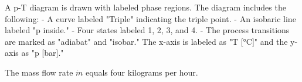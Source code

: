 A p-T diagram is drawn with labeled phase regions. The diagram includes the following:  
- A curve labeled "Triple" indicating the triple point.  
- An isobaric line labeled "p inside."  
- Four states labeled 1, 2, 3, and 4.  
- The process transitions are marked as "adiabat" and "isobar."  
The x-axis is labeled as "T [°C]" and the y-axis as "p [bar]."

The mass flow rate \( \dot{m} \) equals four kilograms per hour.